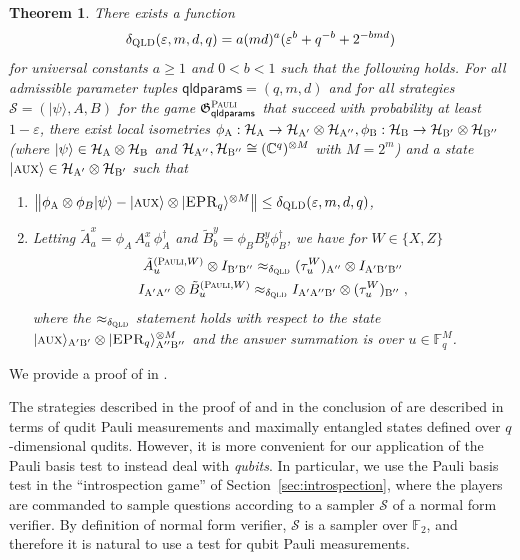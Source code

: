 \documentclass[11pt]{article}
\newtheorem{theorem}{Theorem}[section]
\theoremstyle{definition}
\newcommand{\ket}[1]{|#1\rangle}
\newcommand{\C}{\ensuremath{\mathbb{C}}}
\newcommand{\F}{\ensuremath{\mathbb{F}}}
\newcommand{\mH}{\ensuremath{\mathcal{H}}}
\newcommand{\eps}{\varepsilon}
\newcommand{\game}{\mathfrak{G}}
\newcommand{\sampler}{\mathcal{S}}
\newcommand{\strategy}{\mathscr{S}}
\newcommand{\gamestyle}[1]{\ensuremath{\textsc{#1}}\xspace}
\newcommand{\qld}{\gamestyle{QLD}}
\newcommand{\pauli}{\gamestyle{Pauli}}
\newcommand{\labelstyle}[1]{\ensuremath{\textsc{#1}}\xspace}
\newcommand{\EPR}{\labelstyle{EPR}}
\newcommand{\aux}{\labelstyle{aux}}
\newcommand{\alice}{\labelstyle{A}}
\newcommand{\bob}{\labelstyle{B}}
\newcommand{\qldparams}{\mathsf{qldparams}}
\begin{document}
\begin{theorem}
  \label{thm:pauli}
There exists a function 
\[\delta_{\qld}(\eps,m,d,q) = a(md)^a(\eps^b + q^{-b} + 2^{-bmd})\]
 for universal constants $a \geq 1$ and $0 < b < 1$ such that the following holds. For all admissible parameter tuples $\qldparams = (q,m,d)$ and for all strategies $\strategy = (\ket{\psi},A,B)$ for the game $\game^\pauli_\qldparams$ that succeed with probability at least $1 - \eps$, there exist local isometries $\phi_\alice: \mH_\alice \to \mH_{\alice'} \otimes \mH_{\alice''},\phi_\bob: \mH_\bob \to \mH_{\bob'} \otimes \mH_{\bob''}$ (where $\ket{\psi} \in \mH_\alice \otimes \mH_\bob$ and $\mH_{\alice''},\mH_{\bob''} \cong (\C^q)^{\otimes M}$ with $M = 2^m$) and a state $\ket{\aux} \in \mH_{\alice'} \otimes \mH_{\bob'}$ such that 
\begin{enumerate}
    \item $\left \| \phi_\alice \otimes \phi_B \ket{\psi} - \ket{\aux} \otimes \ket{\EPR_q}^{\otimes M}  \right \| \leq \delta_{\qld}(\eps,m,d,q)$,
    \item Letting $\tilde{A}^x_a = \phi_A\, A^x_a \, \phi_A^\dagger$ and $\tilde{B}^y_b = \phi_B B^y_b \phi_B^\dagger$, we have for $W \in \{X,Z\}$
    \begin{gather*}
        \tilde{A}^{(\pauli,W)}_u \otimes I_{\bob'\bob''} \approx_{\delta_{\qld}} (\tau^W_u)_{\alice''} \otimes I_{\alice' \bob' \bob''} \\
        I_{\alice'\alice''} \otimes \tilde{B}^{(\pauli,W)}_u    \approx_{\delta_{\qld}} I_{\alice' \alice'' \bob'} \otimes (\tau^W_u)_{\bob''}\;,
    \end{gather*}
    where the $\approx_{\delta_{\qld}}$ statement holds with respect to the state $\ket{\aux}_{\alice'\bob'} \otimes \ket{\EPR_q}^{\otimes M}_{\alice''\bob''}$ and the answer summation is over $u \in \F_q^M$.
\end{enumerate}
\end{theorem}

We provide a proof of  in . 


The strategies described in the proof of  and in the conclusion of  are described in terms of qudit Pauli measurements and maximally entangled states defined over $q$-dimensional qudits. 
However, it is more convenient for our application of the Pauli basis test to
instead deal with \emph{qubits}.
In particular, we use the Pauli basis test in the ``introspection game'' of
Section~\ref{sec:introspection}, where the players are commanded to sample
questions according to a sampler $\sampler$ of a normal form verifier.
By definition of normal form verifier, $\sampler$ is a sampler over $\F_2$, and
therefore it is natural to use a test for qubit Pauli measurements.
\end{document}
